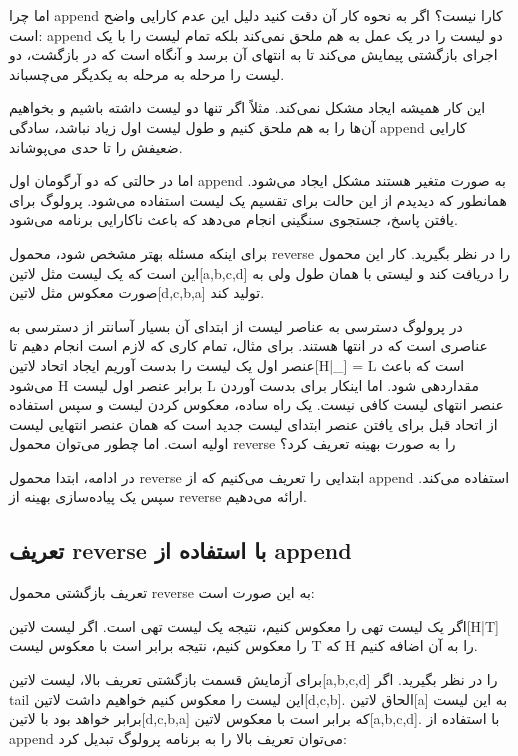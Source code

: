 اما چرا append کارا نیست؟ اگر به نحوه کار آن دقت کنید دلیل این عدم کارایی واضح است: append دو لیست را در یک عمل به هم ملحق نمی‌کند بلکه تمام لیست را با یک اجرای بازگشتی پیمایش می‌کند تا به انتهای آن برسد و آنگاه است که در بازگشت، دو لیست را مرحله به مرحله به یکدیگر می‌چسباند.

این کار همیشه ایجاد مشکل نمی‌کند. مثلاً اگر تنها دو لیست داشته باشیم و بخواهیم آن‌ها را به هم ملحق کنیم و طول لیست اول زیاد نباشد، سادگی append کارایی ضعیفش را تا حدی می‌پوشاند.

اما در حالتی که دو آرگومان اول append به صورت متغیر هستند مشکل ایجاد می‌شود. همانطور که دیدیدم از این حالت برای تقسیم یک لیست استفاده می‌شود. پرولوگ برای یافتن پاسخ، جستجوی سنگینی انجام می‌دهد که باعث ناکارایی برنامه می‌شود.

برای اینکه مسئله بهتر مشخص شود، محمول reverse را در نظر بگیرید. کار این محمول این است که یک لیست مثل ‌لاتین{[a,b,c,d]} را دریافت کند و لیستی با همان طول ولی به صورت معکوس  مثل ‌لاتین{[d,c,b,a]} تولید کند.

در پرولوگ دسترسی به عناصر لیست از ابتدای آن بسیار آسانتر از دسترسی به عناصری است که در انتها هستند. برای مثال، تمام کاری که لازم است انجام دهیم تا عنصر اول یک لیست را بدست آوریم ایجاد اتحاد ‌لاتین{[H|\_] = L} است که باعث می‌شود H برابر عنصر اول لیست L مقداردهی شود. اما اینکار برای بدست آوردن عنصر انتهای لیست کافی نیست. یک راه ساده، معکوس کردن لیست و سپس استفاده از اتحاد قبل برای یافتن عنصر ابتدای لیست جدید است که همان عنصر انتهایی لیست اولیه است. اما چطور می‌توان محمول reverse را به صورت بهینه تعریف کرد؟

در ادامه، ابتدا محمول reverse ابتدایی را تعریف می‌کنیم که از append استفاده می‌کند. سپس یک پیاده‌سازی بهینه از reverse ارائه می‌دهیم.

\subsection{تعریف reverse با استفاده از append}
تعریف بازگشتی محمول reverse به این صورت است:
\begin{enumerate}
 اگر یک لیست تهی را معکوس کنیم، نتیجه یک لیست تهی است.
 اگر لیست ‌لاتین{[H|T]} را معکوس کنیم، نتیجه برابر است با معکوس لیست T که H را به آن اضافه کنیم.
\end{enumerate}

برای آزمایش قسمت بازگشتی تعریف بالا، لیست ‌لاتین{[a,b,c,d]} را در نظر بگیرید. اگر tail این لیست را معکوس کنیم خواهیم داشت ‌لاتین{[d,c,b]}. الحاق ‌لاتین{[a]} به این لیست برابر خواهد بود با ‌لاتین{[d,c,b,a]} که برابر است با معکوس ‌لاتین{[a,b,c,d]}. با استفاده از append می‌توان تعریف بالا را به برنامه پرولوگ تبدیل کرد:

